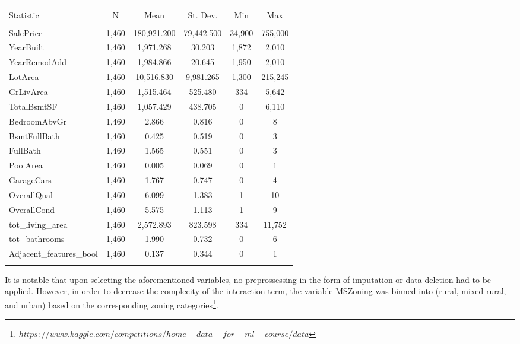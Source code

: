 \documentclass{article}
\begin{document}
\begin{table}[!htbp] \centering 
  \caption{} 
  \label{} 
\begin{tabular}{@{\extracolsep{5pt}}lccccc} 
\\[-1.8ex]\hline 
\hline \\[-1.8ex] 
Statistic & \multicolumn{1}{c}{N} & \multicolumn{1}{c}{Mean} & \multicolumn{1}{c}{St. Dev.} & \multicolumn{1}{c}{Min} & \multicolumn{1}{c}{Max} \\ 
\hline \\[-1.8ex] 
SalePrice & 1,460 & 180,921.200 & 79,442.500 & 34,900 & 755,000 \\ 
YearBuilt & 1,460 & 1,971.268 & 30.203 & 1,872 & 2,010 \\ 
YearRemodAdd & 1,460 & 1,984.866 & 20.645 & 1,950 & 2,010 \\ 
LotArea & 1,460 & 10,516.830 & 9,981.265 & 1,300 & 215,245 \\ 
GrLivArea & 1,460 & 1,515.464 & 525.480 & 334 & 5,642 \\ 
TotalBsmtSF & 1,460 & 1,057.429 & 438.705 & 0 & 6,110 \\ 
BedroomAbvGr & 1,460 & 2.866 & 0.816 & 0 & 8 \\ 
BsmtFullBath & 1,460 & 0.425 & 0.519 & 0 & 3 \\ 
FullBath & 1,460 & 1.565 & 0.551 & 0 & 3 \\ 
PoolArea & 1,460 & 0.005 & 0.069 & 0 & 1 \\ 
GarageCars & 1,460 & 1.767 & 0.747 & 0 & 4 \\ 
OverallQual & 1,460 & 6.099 & 1.383 & 1 & 10 \\ 
OverallCond & 1,460 & 5.575 & 1.113 & 1 & 9 \\ 
tot\_living\_area & 1,460 & 2,572.893 & 823.598 & 334 & 11,752 \\ 
tot\_bathrooms & 1,460 & 1.990 & 0.732 & 0 & 6 \\ 
Adjacent\_features\_bool & 1,460 & 0.137 & 0.344 & 0 & 1 \\ 
\hline \\[-1.8ex] 
\end{tabular} 
\end{table} 


It is notable that upon selecting the aforementioned variables, no preprossessing in the form of imputation or data deletion had to be applied. However, in order to decrease the complecity of the interaction term, the variable MSZoning was binned into (rural, mixed rural, and urban) based on the corresponding zoning categories\footnote{$https://www.kaggle.com/competitions/home-data-for-ml-course/data$}.
\end{document}
